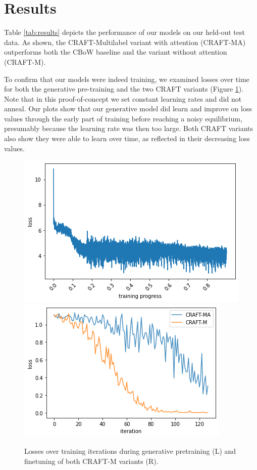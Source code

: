 \documentclass{article}
\begin{document}
\section{Results}
\label{sec:results}

Table \ref{tab:results} depicts the performance of our models on our held-out test data. As shown, the CRAFT-Multilabel variant with attention (CRAFT-MA) outperforms both the CBoW baseline and the variant without attention (CRAFT-M). 

To confirm that our models were indeed training, we examined losses over time for both the generative pre-training and the two CRAFT variants (Figure \ref{fig:losses}). Note that in this proof-of-concept we set constant learning rates and did not anneal. Our plots show that our generative model did learn and improve on loss values through the early part of training before reaching a noisy equilibrium, presumably because the learning rate was then too large. Both CRAFT variants also show they were able to learn over time, as reflected in their decreasing loss values.

\begin{figure}[t]
  \includegraphics[width=\columnwidth]{figs/pretraining-loss.png}
  \includegraphics[width=\columnwidth]{figs/finetuning-loss.png}
  \caption{Losses over training iterations during generative pretraining (L) and finetuning of both CRAFT-M variants (R).}
  \label{fig:losses}
\end{figure}
\end{document}
